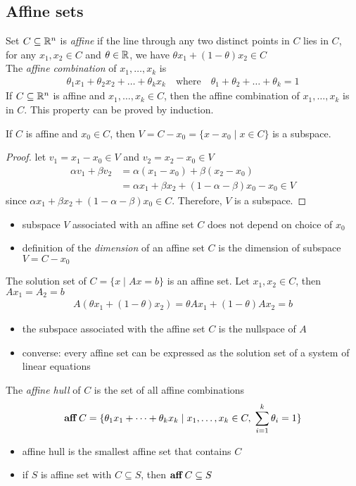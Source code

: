 \subsection{Affine sets}
Set $C\subseteq\mathbb{R}^n$ is \textit{affine} if the line through any two distinct points in $C$ lies in $C$, \ie\\
for any $x_1, x_2\in C$ and $\theta\in\mathbb{R}$, we have $\theta x_1+(1-\theta)x_2\in C$\\
The \textit{affine combination} of $x_1,\dots,x_k$ is
\begin{align*}
  \theta_1x_1+\theta_2x_2+\dots+\theta_kx_k\quad\text{where}\quad\theta_1+\theta_2+\dots+\theta_k=1
\end{align*}
If $C\subseteq \mathbb{R}^n$ is affine and $x_1,\dots,x_k\in C$, then the affine combination of $x_1,\dots,x_k$ is in $C$.
This property can be proved by induction.\par
If $C$ is affine and $x_0\in C$, then $V=C-x_0=\{x-x_0\mid x\in C\}$ is a subspace.
\begin{proof}
  let $v_1=x_1-x_0\in V$ and $v_2=x_2-x_0\in V$
  \begin{align*}
    \alpha v_1+\beta v_2
      &= \alpha (x_1-x_0)+\beta (x_2-x_0)\\
      &= \alpha x_1+\beta x_2+(1-\alpha-\beta)x_0-x_0\in V
  \end{align*}
  since $\alpha x_1+\beta x_2+(1-\alpha-\beta)x_0\in C$.
  Therefore, $V$ is a subspace.
\end{proof}
\begin{itemize}
  \item subspace $V$ associated with an affine set $C$ does not depend on choice of $x_0$
  \item definition of the \textit{dimension} of an affine set $C$ is the dimension of subspace $V=C-x_0$
\end{itemize}
\begin{example}
  The solution set of $C=\{x\mid Ax=b\}$ is an affine set. Let $x_1,x_2\in C$, then $Ax_1=A_2=b$
  \begin{align*}
    A(\theta x_1+(1-\theta)x_2)=\theta Ax_1+(1-\theta)Ax_2=b
  \end{align*}
  \begin{itemize}
    \item the subspace associated with the affine set $C$ is the nullspace of $A$
    \item converse: every affine set can be expressed as the solution set of a system of linear equations
  \end{itemize}
\end{example}
The \textit{affine hull} of $C$ is the set of all affine combinations
\begin{align*}
  \mathop{\bf aff} C=\{\theta_1x_1+\cdots+\theta_kx_k\mid x_1,\dots,x_k\in C,\;\sum_{i=1}^k\theta_i=1\}
\end{align*}
\begin{itemize}
  \item affine hull is the smallest affine set that contains $C$
  \item if $S$ is affine set with $C\subseteq S$, then $\mathop{\bf aff} C\subseteq S$
\end{itemize}


